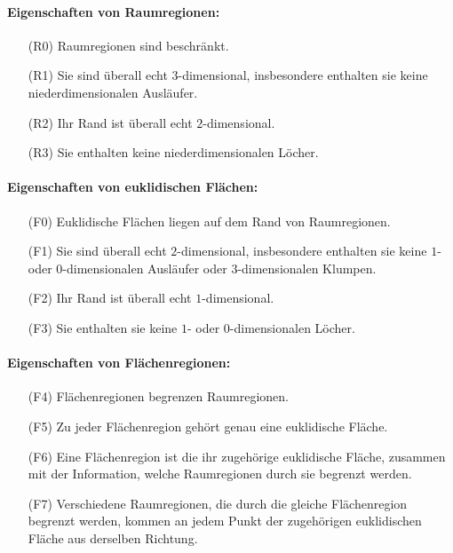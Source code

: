        \paragraph{Eigenschaften von Raumregionen:} 
        \begin{itemize}
            \item[(R0)] Raumregionen sind beschränkt.
            \item[(R1)] Sie sind überall echt $3$-dimensional, insbesondere enthalten sie keine niederdimensionalen Ausläufer.
            \item[(R2)] Ihr Rand ist überall echt $2$-dimensional.
            \item[(R3)] Sie enthalten keine niederdimensionalen Löcher.
        \end{itemize}
        
        \paragraph{Eigenschaften von euklidischen Flächen:} 
        \begin{itemize}
            \item[(F0)] Euklidische Flächen liegen auf dem Rand von Raumregionen.
            \item[(F1)] Sie sind überall echt $2$-dimensional, insbesondere enthalten sie keine $1$- oder $0$-dimensionalen Ausläufer oder $3$-dimensionalen Klumpen.
            \item[(F2)] Ihr Rand ist überall echt $1$-dimensional.
            \item[(F3)] Sie enthalten sie keine $1$- oder $0$-dimensionalen Löcher.
        \end{itemize}
            
        \paragraph{Eigenschaften von Flächenregionen:}
        \begin{itemize}
            \item[(F4)] Flächenregionen begrenzen Raumregionen.
            \item[(F5)] Zu jeder Flächenregion gehört genau
                        eine euklidische Fläche.
            \item[(F6)] Eine Flächenregion ist die ihr zugehörige euklidische Fläche, zusammen mit der Information, welche Raumregionen durch sie begrenzt werden.
            \item[(F7)] Verschiedene Raumregionen, die durch die gleiche Flächenregion begrenzt werden, kommen an jedem Punkt der zugehörigen euklidischen Fläche aus derselben Richtung.
        \end{itemize}


